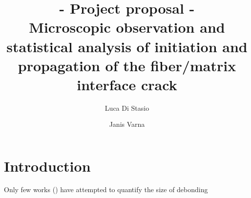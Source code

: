 \documentclass[review]{elsarticle}
\begin{document}
\begin{frontmatter}

\title{{\bf - Project proposal -}\\Microscopic observation and statistical analysis of initiation and propagation of the fiber/matrix interface crack}


\author{Luca Di Stasio}
\author{Janis Varna}






\end{frontmatter}

\linenumbers

\section{Introduction}

Only few works (\cite{Correa2018,Zumaquero2018}) have attempted to quantify the size of debonding
\end{document}
